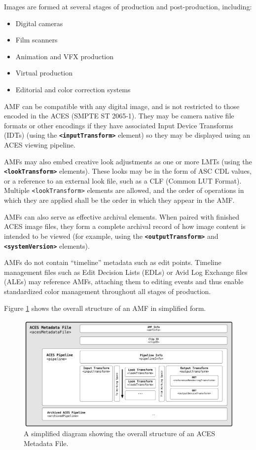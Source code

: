 Images are formed at several stages of production and post-production, including:

\begin{itemize}
    \item Digital cameras
    \item Film scanners 
    \item Animation and VFX production
    \item Virtual production
    \item Editorial and color correction systems
\end{itemize}

AMF can be compatible with any digital image, and is not restricted to those encoded in the ACES (SMPTE ST 2065-1). They may be camera native file formats or other encodings if they have associated Input Device Transforms (IDTs) (using the \texttt{\textbf{<inputTransform>}} element) so they may be displayed using an ACES viewing pipeline.

AMFs may also embed creative look adjustments as one or more LMTs (using the \texttt{\textbf{<lookTransform>}} elements). These looks may be in the form of ASC CDL values, or a reference to an external look file, such as a CLF (Common LUT Format).  Multiple \texttt{<lookTransform>} elements are allowed, and the order of operations in which they are applied shall be the order in which they appear in the AMF.

AMFs can also serve as effective archival elements. When paired with finished ACES image files, they form a complete archival record of how image content is intended to be viewed (for example, using the \texttt{\textbf{<outputTransform>}} and \texttt{\textbf{<systemVersion>}} elements).

AMFs do not contain ``timeline'' metadata such as edit points. Timeline management files such as Edit Decision Lists (EDLs) or Avid Log Exchange files (ALEs) may reference AMFs, attaching them to editing events and thus enable standardized color management throughout all stages of production.

Figure \ref{fig:overviewDiagram} shows the overall structure of an AMF in simplified form.

\begin{figure}[h]
    \includegraphics[width=\textwidth]{./images/amfDiagram.pdf}
    \caption{A simplified diagram showing the overall structure of an ACES Metadata File.}
    \label{fig:overviewDiagram}
    \centering
\end{figure}

